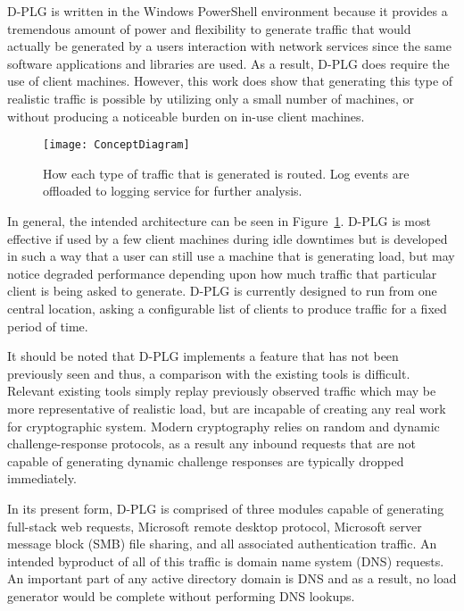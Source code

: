D-PLG is written in the Windows PowerShell environment because it provides a
tremendous amount of power and flexibility to generate traffic that would
actually be generated by a users interaction with network services since the
same software applications and libraries are used.  As a result, D-PLG does
require the use of client machines. However, this work does show that
generating this type of realistic traffic is possible by utilizing only a small
number of machines, or without producing a noticeable burden on in-use client
machines.

\begin{figure}[!ht] \centering 
    \texttt{[image: ConceptDiagram]}
    \caption[Concept Diagram]{How each type of traffic that is generated is
    routed.  Log events are offloaded to logging service for further analysis.}
    \label{fig:conceptDiagram} 
\end{figure}

In general, the intended architecture can be seen in
Figure~\ref{fig:conceptDiagram}.  D-PLG is most effective if used by a few
client machines during idle downtimes but is developed in such a way that a
user can still use a machine that is generating load, but may notice degraded
performance depending upon how much traffic that particular client is being
asked to generate.  D-PLG is currently designed to run from one central
location, asking a configurable list of clients to produce traffic for a fixed
period of time.  

It should be noted that D-PLG implements a feature that has not been previously
seen and thus, a comparison with the existing tools is difficult.  Relevant
existing tools simply replay previously observed traffic which may be more
representative of realistic load, but are incapable of creating any real work
for cryptographic system.  Modern cryptography relies on random and dynamic
challenge-response protocols, as a result any inbound requests that are not
capable of generating dynamic challenge responses are typically dropped
immediately.

In its present form, D-PLG is comprised of three modules capable of generating
full-stack web requests, Microsoft remote desktop protocol, Microsoft server
message block (SMB) file sharing, and all associated authentication traffic.
An intended byproduct of all of this traffic is domain name system (DNS)
requests.  An important part of any active directory domain is DNS and as a
result, no load generator would be complete without performing DNS lookups.

